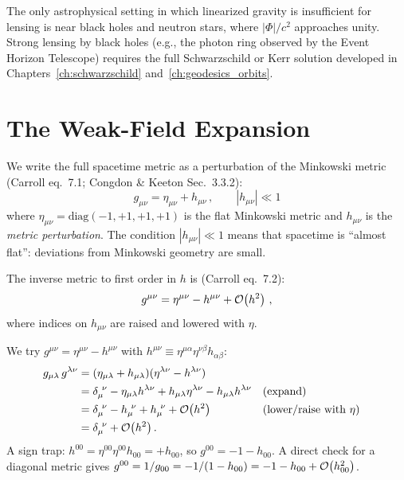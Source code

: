 \begin{remark}
The only astrophysical setting in which linearized gravity is
insufficient for lensing is near black holes and neutron stars,
where $|\Phi|/c^2$ approaches unity.  Strong lensing by black holes
(e.g., the photon ring observed by the Event Horizon Telescope) requires
the full Schwarzschild or Kerr solution developed in Chapters~\ref{ch:schwarzschild} and~\ref{ch:geodesics_orbits}.
\end{remark}


\section{The Weak-Field Expansion}
\label{sec:weak_field_expansion}

We write the full spacetime metric as a perturbation of the Minkowski
metric (Carroll eq.~7.1; Congdon \& Keeton Sec.~3.3.2):
\begin{equation}
    \boxed{
    g_{\mu\nu} = \eta_{\mu\nu} + h_{\mu\nu} \,,
    \qquad |h_{\mu\nu}| \ll 1
    }
    \label{eq:metric_perturbation}
\end{equation}
where $\eta_{\mu\nu} = \mathrm{diag}(-1, +1, +1, +1)$ is the flat
Minkowski metric and $h_{\mu\nu}$ is the \emph{metric perturbation}.
The condition $|h_{\mu\nu}| \ll 1$ means that spacetime is ``almost
flat'': deviations from Minkowski geometry are small.

The inverse metric to first order in $h$ is (Carroll eq.~7.2):
\begin{equation}
    g^{\mu\nu} = \eta^{\mu\nu} - h^{\mu\nu} + \mathcal{O}\!\left(h^2\right) \,,
    \label{eq:inverse_metric_linearized}
\end{equation}
where indices on $h_{\mu\nu}$ are raised and lowered with $\eta$.

\begin{derivation}
We try $g^{\mu\nu} = \eta^{\mu\nu} - h^{\mu\nu}$ with
$h^{\mu\nu} \equiv \eta^{\mu\alpha}\eta^{\nu\beta}h_{\alpha\beta}$:
\begin{align*}
g_{\mu\lambda}\,g^{\lambda\nu}
&= (\eta_{\mu\lambda} + h_{\mu\lambda})(\eta^{\lambda\nu} - h^{\lambda\nu}) \\
&= \delta_\mu^{\ \nu} - \eta_{\mu\lambda}h^{\lambda\nu}
   + h_{\mu\lambda}\eta^{\lambda\nu} - h_{\mu\lambda}h^{\lambda\nu}
  && \text{(expand)} \\
&= \delta_\mu^{\ \nu} - h_\mu^{\ \nu} + h_\mu^{\ \nu} + \mathcal{O}\!\left(h^2\right)
  && \text{(lower/raise with } \eta\text{)} \\
&= \delta_\mu^{\ \nu} + \mathcal{O}\!\left(h^2\right) .
\end{align*}
A sign trap: $h^{00} = \eta^{00}\eta^{00}h_{00} = +h_{00}$, so
$g^{00} = -1 - h_{00}$.  A direct check for a diagonal metric gives
$g^{00} = 1/g_{00} = -1/(1 - h_{00}) = -1 - h_{00} + \mathcal{O}\!\left(h_{00}^2\right)$.
\end{derivation}


